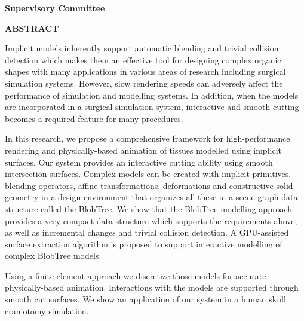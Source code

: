 \pagebreak
\newpage
{}

\noindent \textbf{Supervisory Committee}
\tpbreak
\panel

\begin{center}
\textbf{ABSTRACT}
\end{center}
Implicit models inherently support automatic blending and trivial collision detection 
which makes them an effective tool for designing complex organic shapes with many applications in 
various areas of research including surgical simulation systems. However, slow rendering speeds can 
adversely affect the performance of simulation and modelling systems. In addition, when the models are 
incorporated in a surgical simulation system, interactive and smooth cutting becomes a required feature 
for many procedures.

In this research, we propose a comprehensive framework for high-performance rendering
and physically-based animation of tissues modelled using implicit surfaces.
Our system provides an interactive cutting ability using smooth intersection surfaces.
Complex models can be created with implicit primitives, blending operators, affine
transformations, deformations and constructive solid geometry in a design environment that organizes
all these in a scene graph data structure called the BlobTree. We show that the
BlobTree modelling approach provides a very compact data structure which supports 
the requirements above, as well as incremental changes and trivial collision detection.
A GPU-assisted surface extraction algorithm is proposed to support interactive modelling of complex 
BlobTree models.

Using a finite element approach we discretize those models for accurate physically-based animation. 
Interactions with the models are supported through smooth cut surfaces. We show an application of our
system in a human skull craniotomy simulation.


\pagebreak


